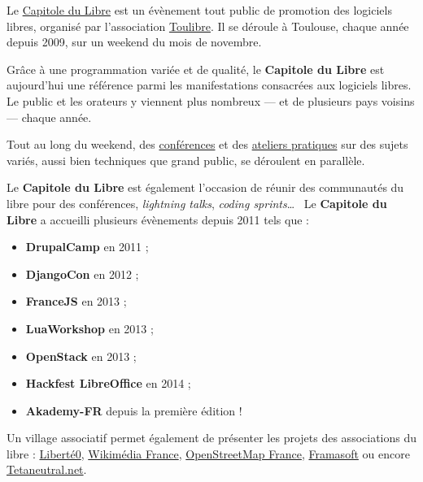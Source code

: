 
Le \href{http://capitoledulibre.org}{Capitole du Libre} est un
 évènement tout public de promotion des logiciels libres,
 organisé par l’association \href{http://toulibre.org/}{Toulibre}.
 Il se déroule à Toulouse, chaque année depuis 2009, sur un 
 weekend du mois de novembre.

Grâce à une programmation variée et de qualité, 
 le \textbf{Capitole du Libre} est aujourd’hui une référence
 parmi les manifestations consacrées aux logiciels libres. Le
 public et les orateurs y viennent plus nombreux — et
 de plusieurs pays voisins — chaque année.

Tout au long du weekend, des
 \href{http://2014.capitoledulibre.org/programme/conferences/list/}{conférences}
 et des \href{http://2014.capitoledulibre.org/programme/ateliers/list/}{ateliers pratiques}
 sur des sujets variés, aussi bien techniques que grand public, se déroulent en parallèle.



 
\Separateur

Le \textbf{Capitole du Libre} est également l'occasion de réunir des 
communautés du libre pour des conférences, \textit{lightning talks}, 
\textit{coding sprints}\dots ~ Le \textbf{Capitole du Libre} a 
accueilli plusieurs évènements depuis 2011 tels que :
\begin{itemize}[label=$\bullet$]
\item \textbf{DrupalCamp} en 2011 ;
\item \textbf{DjangoCon} en 2012 ;
\item \textbf{FranceJS} en 2013 ;
\item \textbf{LuaWorkshop} en 2013 ;
\item \textbf{OpenStack} en 2013 ;
\item \textbf{Hackfest LibreOffice}  en 2014 ;
\item \textbf{Akademy-FR} depuis la première édition !
\end{itemize}

\Separateur

Un village associatif permet également de présenter les projets des associations du libre : \href{http://liberte0.org/wiki/index.php?title=Accueil}{Liberté0},
 \href{http://wikimedia.fr/}{Wikimédia France},
 \href{http://openstreetmap.fr/}{OpenStreetMap France},
 \href{http://framasoft.net/}{Framasoft}
 ou encore \href{http://tetaneutral.net/}{Tetaneutral.net}.

